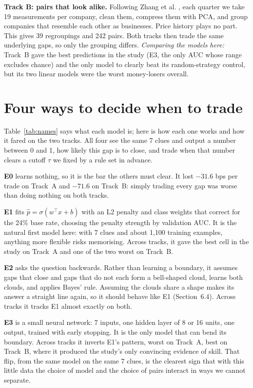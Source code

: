\documentclass[10pt]{article}
\begin{document}
\textbf{Track B: pairs that look alike.} Following Zhang et al.
\cite{zhang2014}, each quarter we take 19 measurements per company, clean them,
compress them with PCA, and group companies that resemble each other as
businesses. Price history plays no part. This gives 39 regroupings and 242
pairs. Both tracks then trade the same underlying gaps, so only the grouping
differs. \emph{Comparing the models here:} Track~B gave the best predictions in
the study (E3, the only AUC whose range excludes chance) and the only model to
clearly beat its random-strategy control, but its two linear models were the
worst money-losers overall.

\section{Four ways to decide when to trade}

Table~\ref{tab:names} says what each model is; here is how each one works and how
it fared on the two tracks. All four see the same 7 clues and output a number
between 0 and 1, how likely this gap is to close, and trade when that
number clears a cutoff $\tau$ we fixed by a rule set in advance.

\textbf{E0} learns nothing, so it is the bar the others must clear. It lost
$-31.6$ bps per trade on Track~A and $-71.6$ on Track~B: simply trading every gap
was worse than doing nothing on both tracks.

\textbf{E1} fits $\hat p = \sigma(w^\top x + b)$ with an L2 penalty and class
weights that correct for the 24\% base rate, choosing the penalty strength by
validation AUC. It is the natural first model here: with 7 clues and about 1{,}100
training examples, anything more flexible risks memorising. Across tracks,
it gave the best cell in the study on Track~A and one of the two worst on
Track~B.

\textbf{E2} asks the question backwards. Rather than learning a boundary, it
assumes gaps that close and gaps that do not each form a bell-shaped cloud,
learns both clouds, and applies Bayes' rule. Assuming the clouds share a shape
makes its answer a straight line again, so it should behave like E1 (Section~6.4). Across tracks it tracks E1 almost exactly on both.

\textbf{E3} is a small neural network: 7 inputs, one hidden layer of 8 or 16 units, one
output, trained with early stopping. It is the only model that can bend its
boundary. Across tracks it inverts E1's pattern, worst on Track~A, best
on Track~B, where it produced the study's only convincing evidence of skill. That
flip, from the same model on the same 7 clues, is the clearest sign that with this
little data the choice of model and the choice of pairs interact in ways we cannot
separate.
\end{document}
